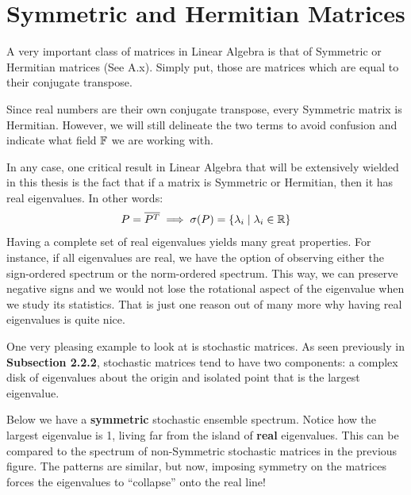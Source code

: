 \section{Symmetric and Hermitian Matrices}

A very important class of matrices in Linear Algebra is that of Symmetric or Hermitian matrices (See A.x). Simply put, those are matrices which are equal to their conjugate transpose.

\begin{remark}
Since real numbers are their own conjugate transpose, every Symmetric matrix is Hermitian. However, we will still delineate the two terms to avoid confusion and indicate what field $\mathbb{F}$ we are working with.
\end{remark}

In any case, one critical result in Linear Algebra that will be extensively wielded in this thesis is the fact that if a matrix is Symmetric or Hermitian, then it has real eigenvalues. In other words:
\begin{align*}
P = \overline{P^{T}} \implies \sigma(P) = \{\lambda_i \mid \lambda_i \in \mathbb{R}\}
\end{align*}
Having a complete set of real eigenvalues yields many great properties. For instance, if all eigenvalues are real, we have the option of observing either the sign-ordered spectrum or the norm-ordered spectrum.
This way, we can preserve negative signs and we would not lose the rotational aspect of the eigenvalue when we study its statistics. That is just one reason out of many more why having real eigenvalues is quite nice.


One very pleasing example to look at is stochastic matrices.
As seen previously in \textbf{Subsection 2.2.2}, stochastic matrices tend to have two components: a complex disk of eigenvalues about the origin and isolated point that is the largest eigenvalue.

Below we have a \textbf{symmetric} stochastic ensemble spectrum. Notice how the largest eigenvalue is 1, living far from the island of \textbf{real} eigenvalues.
This can be compared to the spectrum of non-Symmetric stochastic matrices in the previous figure.
The patterns are similar, but now, imposing symmetry on the matrices forces the eigenvalues to ``collapse'' onto the real line!

